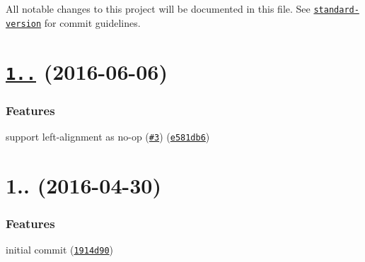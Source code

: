 All notable changes to this project will be documented in this file. See \href{https://github.com/conventional-changelog/standard-version}{\tt standard-\/version} for commit guidelines.

\label{_1.1.0}%
 \section*{\href{https://github.com/nexdrew/ansi-align/compare/v1.0.0...v1.1.0}{\tt 1..} (2016-\/06-\/06)}

\subsubsection*{Features}


\begin{DoxyItemize}
\item support left-\/alignment as no-\/op (\href{https://github.com/nexdrew/ansi-align/issues/3}{\tt \#3}) (\href{https://github.com/nexdrew/ansi-align/commit/e581db6}{\tt e581db6})
\end{DoxyItemize}

\label{_1.0.0}%
 \section*{1.. (2016-\/04-\/30)}

\subsubsection*{Features}


\begin{DoxyItemize}
\item initial commit (\href{https://github.com/nexdrew/ansi-align/commit/1914d90}{\tt 1914d90}) 
\end{DoxyItemize}